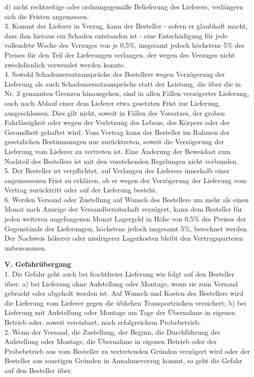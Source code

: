 \begin{multicols}{2}
\begin{scriptsize}
	d) nicht rechtzeitige oder ordnungsgemäße Belieferung des Lieferers, verlängern sich die Fristen angemessen.\\
	3. Kommt der Lieferer in Verzug, kann der Besteller - sofern er glaubhaft macht, dass ihm hieraus ein Schaden entstanden ist - eine Entschädigung für jede vollendete Woche des Verzuges von je 0,5\%, insgesamt jedoch höchstens 5\% des Preises für den Teil der Lieferungen verlangen, der wegen des Verzuges nicht zweckdienlich verwendet werden konnte.\\
	4. Sowohl Schadensersatzansprüche des Bestellers wegen Verzögerung der Lieferung als auch Schadensersatzansprüche statt der Leistung, die über die in Nr. 3 genannten Grenzen hinausgehen, sind in allen Fällen verzögerter Lieferung, auch nach Ablauf einer dem Lieferer etwa gesetzten Frist zur Lieferung, ausgeschlossen. Dies gilt nicht, soweit in Fällen des Vorsatzes, der groben Fahrlässigkeit oder wegen der Verletzung des Lebens, des Körpers oder der Gesundheit gehaftet wird. Vom Vertrag kann der Besteller im Rahmen der gesetzlichen Bestimmungen nur zurücktreten, soweit die Verzögerung der Lieferung vom Lieferer zu vertreten ist. Eine Änderung der Beweislast zum Nachteil des Bestellers ist mit den vorstehenden Regelungen nicht verbunden.\\
	5. Der Besteller ist verpflichtet, auf Verlangen des Lieferers innerhalb einer angemessenen Frist zu erklären, ob er wegen der Verzögerung der Lieferung vom Vertrag zurücktritt oder auf der Lieferung besteht.\\
	6. Werden Versand oder Zustellung auf Wunsch des Bestellers um mehr als einen Monat nach Anzeige der Versandbereitschaft verzögert, kann dem Besteller für jeden weiteren angefangenen Monat Lagergeld in Höhe von 0,5\% des Preises der Gegenstände der Lieferungen, höchstens jedoch insgesamt 5\%, berechnet werden. Der Nachweis höherer oder niedrigerer Lagerkosten bleibt den Vertragsparteien unbenommen.
	
	\textbf{V. Gefahrübergang}\\
	1. Die Gefahr geht auch bei frachtfreier Lieferung wie folgt auf den Besteller über: a) bei Lieferung ohne Aufstellung oder Montage, wenn sie zum Versand gebracht oder abgeholt worden ist. Auf Wunsch und Kosten des Bestellers wird die Lieferung vom Lieferer gegen die üblichen Transportrisiken versichert; b) bei Lieferung mit Aufstellung oder Montage am Tage der Übernahme in eigenen Betrieb oder, soweit vereinbart, nach erfolgreichem Probebetrieb.\\
	2. Wenn der Versand, die Zustellung, der Beginn, die Durchführung der Aufstellung oder Montage, die Übernahme in eigenen Betrieb oder der Probebetrieb aus vom Besteller zu vertretenden Gründen verzögert wird oder der Besteller aus sonstigen Gründen in Annahmeverzug kommt, so geht die Gefahr auf den Besteller über.
	

\end{scriptsize}
\end{multicols}

